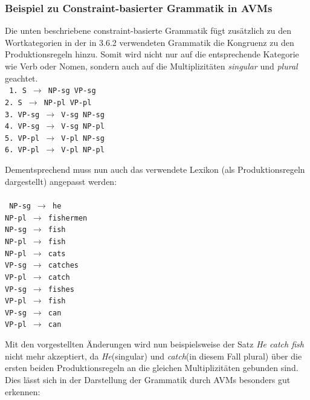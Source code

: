 \documentclass[12pt]{report}
\begin{document}
\subsubsection{Beispiel zu Constraint-basierter Grammatik in AVMs}
Die unten beschriebene constraint-basierte Grammatik fügt zusätzlich zu den Wortkategorien in der in 3.6.2 verwendeten Grammatik die Kongruenz zu den Produktionsregeln hinzu. Somit wird nicht nur auf die entsprechende Kategorie wie Verb oder Nomen, sondern auch auf die Multiplizitäten \textit{singular} und \textit{plural} geachtet. \newline
\\
\tt
1. S $\rightarrow$ NP-sg VP-sg\\
2. S $\rightarrow$ NP-pl VP-pl\\
3. VP-sg $\rightarrow$ V-sg NP-sg\\
4. VP-sg $\rightarrow$ V-sg NP-pl\\
5. VP-pl $\rightarrow$ V-pl NP-sg\\
6. VP-pl $\rightarrow$ V-pl NP-pl\\
\rm

Dementsprechend muss nun auch das verwendete Lexikon (als Produktionsregeln dargestellt) angepasst werden:\\
\\
\tt
NP-sg $\rightarrow$ he\\
NP-pl $\rightarrow$ fishermen\\
NP-sg $\rightarrow$ fish\\
NP-pl $\rightarrow$ fish\\
NP-pl $\rightarrow$ cats\\
VP-sg $\rightarrow$ catches\\
VP-pl $\rightarrow$ catch\\
VP-sg $\rightarrow$ fishes\\
VP-pl $\rightarrow$ fish\\
VP-sg $\rightarrow$ can\\
VP-pl $\rightarrow$ can\\
\rm

Mit den vorgestellten Änderungen wird nun beispielsweise der Satz \textit{\glqq  He catch fish\grqq{}} nicht mehr akzeptiert, da \textit{\glqq  He\grqq{}}(singular) und \textit{\glqq  catch\grqq{}}(in diesem Fall plural) über die ersten beiden Produktionsregeln an die gleichen Multiplizitäten gebunden sind. 
Dies lässt sich in der Darstellung der Grammatik durch AVMs besonders gut erkennen:\\
\end{document}
